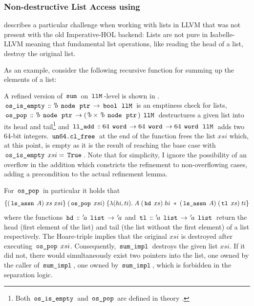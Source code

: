 \subsubsection{Non-destructive List Access using }\label{sec:non-destructive-list-access-using-fold}

 describes a particular challenge when working with lists in LLVM that was not present with the old Imperative-HOL backend:
Lists are not pure in Isabelle-LLVM meaning that fundamental list operations, like reading the head of a list, destroy the original list.

As an example, consider the following recursive function for summing up the elements of a list:

A refined version of $\,\text{\ttfamily sum}\,$ on $\,\text{\ttfamily llM}\,$-level is shown in .
$\,\text{\ttfamily os\_is\_empty}\, \mathrel{\mathord{:}\mkern-1.2mu\mathord{:}} {\mskip2mu '\mskip-2mub} \; \,\text{\ttfamily node}\, \; \,\text{\ttfamily ptr}\, \rightarrow \,\text{\ttfamily bool}\, \; \,\text{\ttfamily llM}\,$ is an emptiness check for lists, $\,\text{\ttfamily os\_pop}\, \mathrel{\mathord{:}\mkern-1.2mu\mathord{:}} {\mskip2mu '\mskip-2mub} \; \,\text{\ttfamily node}\, \; \,\text{\ttfamily ptr}\, \rightarrow ({\mskip2mu '\mskip-2mub} \times {\mskip2mu '\mskip-2mub} \; \,\text{\ttfamily node}\, \; \,\text{\ttfamily ptr}\,) \; \,\text{\ttfamily llM}\,$ destructures a given list into its head and tail\footnote{Both $\,\text{\ttfamily os\_is\_empty}\,$ and $\,\text{\ttfamily os\_pop}\,$ are defined in theory .} and $\,\text{\ttfamily ll\_add}\, \mathrel{\mathord{:}\mkern-1.2mu\mathord{:}} 64 \; \,\text{\ttfamily word}\, \rightarrow 64 \; \,\text{\ttfamily word}\, \rightarrow 64 \; \,\text{\ttfamily word}\, \; \,\text{\ttfamily llM}\,$ adds two 64-bit integers.
$\,\text{\ttfamily un64.cl\_free}\,$ at the end of the function frees the list $xsi$ which, at this point, is empty as it is the result of reaching the base case with $\,\text{\ttfamily os\_is\_empty}\, \; xsi = \,\text{\ttfamily True}\,$.
Note that for simplicity, I ignore the possibility of an overflow in the addition which constricts the refinement to non-overflowing cases, adding a precondition to the actual refinement lemma.

For $\,\text{\ttfamily os\_pop}\,$ in particular it holds that
\begin{gather*}
	\{(\,\text{\ttfamily ls\_assn}\, \; A) \; xs \; xsi\} \;
	(\,\text{\ttfamily os\_pop}\, \; xsi) \;
	\{\lambda (hi,ti). \; A \; (\,\text{\ttfamily hd}\, \; xs) \; hi \; \ast \; (\,\text{\ttfamily ls\_assn}\, \; A) \; (\,\text{\ttfamily tl}\, \; xs) \; ti\}
\end{gather*}
where the functions $\,\text{\ttfamily hd}\, \mathrel{\mathord{:}\mkern-1.2mu\mathord{:}} {\mskip2mu '\mskip-2mua} \; \,\text{\ttfamily list}\, \rightarrow {\mskip2mu '\mskip-2mua}$ and $\,\text{\ttfamily tl}\, \mathrel{\mathord{:}\mkern-1.2mu\mathord{:}} {\mskip2mu '\mskip-2mua} \; \,\text{\ttfamily list}\, \rightarrow {\mskip2mu '\mskip-2mua} \; \,\text{\ttfamily list}\,$ return the head (first element of the list) and tail (the list without the first element) of a list respectively.
The Hoare-triple implies that the original $xsi$ is destroyed after executing $\,\text{\ttfamily os\_pop}\, \; xsi$.
Consequently, $\,\text{\ttfamily sum\_impl}\,$ destroys the given list $xsi$.
If it did not, there would simultaneously exist two pointers into the list, one owned by the caller of $\,\text{\ttfamily sum\_impl}\,$, one owned by $\,\text{\ttfamily sum\_impl}\,$, which is forbidden in the separation logic.

